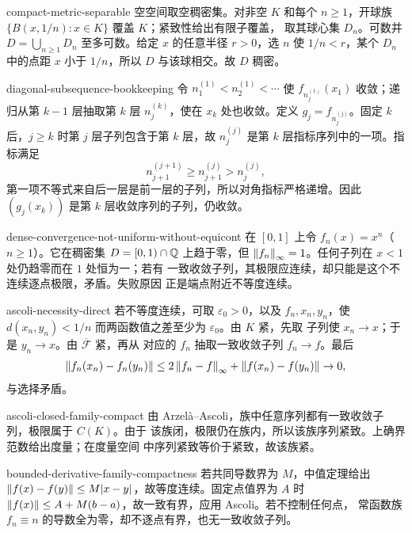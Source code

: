 \begin{solution}{compact-metric-separable}
空空间取空稠密集。对非空 $K$ 和每个 $n\ge1$，开球族
$\{B(x,1/n):x\in K\}$ 覆盖 $K$；紧致性给出有限子覆盖，
取其球心集 $D_n$。可数并 $D=\bigcup_{n\ge1}D_n$ 至多可数。给定 $x$ 的任意半径
$r>0$，选 $n$ 使 $1/n<r$，某个 $D_n$ 中的点距 $x$ 小于 $1/n$，所以
$D$ 与该球相交。故 $D$ 稠密。
\end{solution}

\begin{solution}{diagonal-subsequence-bookkeeping}
令 $n^{(1)}_1<n^{(1)}_2<\cdots$ 使 $f_{n^{(1)}_j}(x_1)$ 收敛；递归从第
$k-1$ 层抽取第 $k$ 层 $n^{(k)}_j$，使在 $x_k$ 处也收敛。定义
$g_j=f_{n^{(j)}_j}$。固定 $k$ 后，$j\ge k$ 时第 $j$ 层子列包含于第 $k$
层，故 $n^{(j)}_j$ 是第 $k$ 层指标序列中的一项。指标满足
\[
 n^{(j+1)}_{j+1}\ge n^{(j)}_{j+1}>n^{(j)}_j,
\]
第一项不等式来自后一层是前一层的子列，所以对角指标严格递增。因此
$(g_j(x_k))$ 是第 $k$ 层收敛序列的子列，仍收敛。
\end{solution}

\begin{solution}{dense-convergence-not-uniform-without-equicont}
在 $[0,1]$ 上令 $f_n(x)=x^n$（$n\ge1$）。它在稠密集
$D=[0,1)\cap\mathbb{Q}$ 上趋于零，但
$\left\lVert f_n\right\rVert_\infty=1$。任何子列在 $x<1$ 处仍趋零而在 $1$ 处恒为一；若有
一致收敛子列，其极限应连续，却只能是这个不连续逐点极限，矛盾。失败原因
正是端点附近不等度连续。
\end{solution}

\begin{solution}{ascoli-necessity-direct}
若不等度连续，可取 $\varepsilon_0>0$，以及 $f_n,x_n,y_n$，使
$d(x_n,y_n)<1/n$ 而两函数值之差至少为 $\varepsilon_0$。由 $K$ 紧，先取
子列使 $x_n\to x$；于是 $y_n\to x$。由 $\overline{\mathcal F}$ 紧，再从
对应的 $f_n$ 抽取一致收敛子列 $f_n\to f$。最后
\[
 \left\lVert f_n(x_n)-f_n(y_n)\right\rVert
 \le2\left\lVert f_n-f\right\rVert_\infty+\left\lVert f(x_n)-f(y_n)\right\rVert\to0,
\]
与选择矛盾。
\end{solution}

\begin{solution}{ascoli-closed-family-compact}
由 Arzelà--Ascoli，族中任意序列都有一致收敛子列，极限属于 $C(K)$。由于
该族闭，极限仍在族内，所以该族序列紧致。上确界范数给出度量；在度量空间
中序列紧致等价于紧致，故该族紧。
\end{solution}

\begin{solution}{bounded-derivative-family-compactness}
若共同导数界为 $M$，中值定理给出
$\left\lVert f(x)-f(y)\right\rVert\le M|x-y|$，故等度连续。固定点值界为 $A$ 时
$\left\lVert f(x)\right\rVert\le A+M(b-a)$，故一致有界，应用 Ascoli。若不控制任何点，
常函数族 $f_n\equiv n$ 的导数全为零，却不逐点有界，也无一致收敛子列。
\end{solution}

